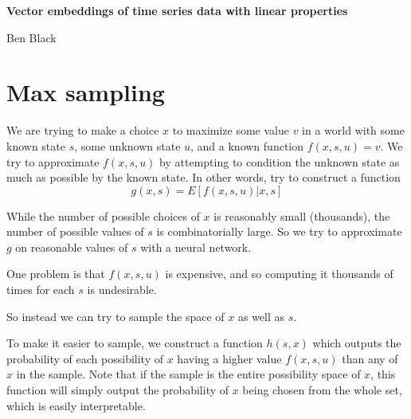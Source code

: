 \documentclass{article}
\begin{document}
	\hfill \textbf{Vector embeddings of time series data with linear properties}
	
	\hfill Ben Black
	
	\section{Max sampling}
	
	We are trying to make a choice $x$ to maximize some value $v$ in a world with some known state $s$, some unknown state $u$, and a known function $f(x,s,u) = v$. We try to approximate $f(x,s,u)$ by attempting to condition the unknown state as much as possible by the known state. In other words, try to construct a function $$g(x,s) = E[f(x,s,u) | x,s]$$
	
	While the number of possible choices of $x$ is reasonably small (thousands), the number of possible values of $s$ is combinatorially large. So we try to approximate $g$ on reasonable values of $s$ with a neural network. 
	
	One problem is that $f(x,s,u)$ is expensive, and so computing it thousands of times for each $s$ is undesirable. 
	
	So instead we can try to sample the space of $x$ as well as $s$. 
	
	To make it easier to sample, we construct a function $h(s,x)$ which outputs the probability of each possibility of $x$ having a higher value $f(x,s,u)$ than any of $x$ in the sample. Note that if the sample is the entire possibility space of $x$, this function will simply output the probability of $x$ being chosen from the whole set, which is easily interpretable. 
	
	
	
	
\end{document}
